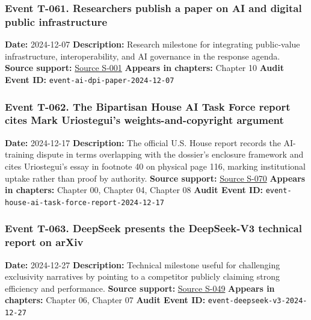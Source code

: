 \documentclass[
  american,
  11pt,
  letterpaper,
]{article}
\begin{document}
\subsubsection{Event T-061. Researchers publish a paper on AI and
digital public
infrastructure}\label{event-t-061-researchers-publish-a-paper-on-ai-and-digital-public-infrastructure}

\textbf{Date:} 2024-12-07 \textbf{Description:} Research milestone for
integrating public-value infrastructure, interoperability, and AI
governance in the response agenda. \textbf{Source support:}
\hyperref[source-s-001-interactions-between-artificial-intelligence-and-digital-public-infrastructure-concepts-benefits-and-challenges]{Source
S-001} \textbf{Appears in chapters:} Chapter 10 \textbf{Audit Event ID:}
\texttt{event-ai-dpi-paper-2024-12-07}

\subsubsection{Event T-062. The Bipartisan House AI Task Force report
cites Mark Uriostegui's weights-and-copyright
argument}\label{event-t-062-the-bipartisan-house-ai-task-force-report-cites-mark-uriostegui-s-weights-and-copyright-argument}

\textbf{Date:} 2024-12-17 \textbf{Description:} The official U.S. House
report records the AI-training dispute in terms overlapping with the
dossier's enclosure framework and cites Uriostegui's essay in footnote
40 on physical page 116, marking institutional uptake rather than proof
by authority. \textbf{Source support:}
\hyperref[source-s-070-bipartisan-house-task-force-report-on-artificial-intelligence]{Source
S-070} \textbf{Appears in chapters:} Chapter 00, Chapter 04, Chapter 08
\textbf{Audit Event ID:}
\texttt{event-house-ai-task-force-report-2024-12-17}

\subsubsection{Event T-063. DeepSeek presents the DeepSeek-V3 technical
report on
arXiv}\label{event-t-063-deepseek-presents-the-deepseek-v3-technical-report-on-arxiv}

\textbf{Date:} 2024-12-27 \textbf{Description:} Technical milestone
useful for challenging exclusivity narratives by pointing to a
competitor publicly claiming strong efficiency and performance.
\textbf{Source support:}
\hyperref[source-s-049-deepseek-v3-technical-report]{Source S-049}
\textbf{Appears in chapters:} Chapter 06, Chapter 07 \textbf{Audit Event
ID:} \texttt{event-deepseek-v3-2024-12-27}
\end{document}
